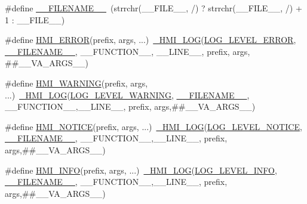 \begin{DoxyCompactItemize}
\item 
\#define \hyperlink{src_2hmi-debug_8h_a5fccb4fc71e44089a1b1a77fc76c0b68}{\+\_\+\+\_\+\+F\+I\+L\+E\+N\+A\+M\+E\+\_\+\+\_\+}~(strrchr(\+\_\+\+\_\+\+F\+I\+L\+E\+\_\+\+\_\+, \textquotesingle{}/\textquotesingle{}) ? strrchr(\+\_\+\+\_\+\+F\+I\+L\+E\+\_\+\+\_\+, \textquotesingle{}/\textquotesingle{}) + 1 \+: \+\_\+\+\_\+\+F\+I\+L\+E\+\_\+\+\_\+)
\item 
\#define \hyperlink{src_2hmi-debug_8h_a65bb6c7cfe38f8a724beab5059d36fb2}{H\+M\+I\+\_\+\+E\+R\+R\+OR}(prefix,  args, ...)~\hyperlink{src_2hmi-debug_8h_a0846b9d51e2e0612c4825a9a581aa40a}{\+\_\+\+H\+M\+I\+\_\+\+L\+OG}(\hyperlink{src_2hmi-debug_8h_aa5a9053636a30269210c54e734e0d583a5b40f003febbc3b535649d63f4b8a44f}{L\+O\+G\+\_\+\+L\+E\+V\+E\+L\+\_\+\+E\+R\+R\+OR}, \hyperlink{src_2hmi-debug_8h_a5fccb4fc71e44089a1b1a77fc76c0b68}{\+\_\+\+\_\+\+F\+I\+L\+E\+N\+A\+M\+E\+\_\+\+\_\+}, \+\_\+\+\_\+\+F\+U\+N\+C\+T\+I\+O\+N\+\_\+\+\_\+, \+\_\+\+\_\+\+L\+I\+N\+E\+\_\+\+\_\+, prefix, args, \#\#\+\_\+\+\_\+\+V\+A\+\_\+\+A\+R\+G\+S\+\_\+\+\_\+)
\item 
\#define \hyperlink{src_2hmi-debug_8h_a25361812432cd2480bc8f1a8e56ecbf7}{H\+M\+I\+\_\+\+W\+A\+R\+N\+I\+NG}(prefix,  args, ...)~\hyperlink{src_2hmi-debug_8h_a0846b9d51e2e0612c4825a9a581aa40a}{\+\_\+\+H\+M\+I\+\_\+\+L\+OG}(\hyperlink{src_2hmi-debug_8h_aa5a9053636a30269210c54e734e0d583a5b4dd81b4dc7eefbc55ba03415c627ef}{L\+O\+G\+\_\+\+L\+E\+V\+E\+L\+\_\+\+W\+A\+R\+N\+I\+NG}, \hyperlink{src_2hmi-debug_8h_a5fccb4fc71e44089a1b1a77fc76c0b68}{\+\_\+\+\_\+\+F\+I\+L\+E\+N\+A\+M\+E\+\_\+\+\_\+}, \+\_\+\+\_\+\+F\+U\+N\+C\+T\+I\+O\+N\+\_\+\+\_\+,\+\_\+\+\_\+\+L\+I\+N\+E\+\_\+\+\_\+, prefix, args,\#\#\+\_\+\+\_\+\+V\+A\+\_\+\+A\+R\+G\+S\+\_\+\+\_\+)
\item 
\#define \hyperlink{src_2hmi-debug_8h_abc0d6e0760017d8ae48b836925b2ef15}{H\+M\+I\+\_\+\+N\+O\+T\+I\+CE}(prefix,  args, ...)~\hyperlink{src_2hmi-debug_8h_a0846b9d51e2e0612c4825a9a581aa40a}{\+\_\+\+H\+M\+I\+\_\+\+L\+OG}(\hyperlink{src_2hmi-debug_8h_aa5a9053636a30269210c54e734e0d583a23ae4d711a7bbb3900240cb7316b4b4e}{L\+O\+G\+\_\+\+L\+E\+V\+E\+L\+\_\+\+N\+O\+T\+I\+CE}, \hyperlink{src_2hmi-debug_8h_a5fccb4fc71e44089a1b1a77fc76c0b68}{\+\_\+\+\_\+\+F\+I\+L\+E\+N\+A\+M\+E\+\_\+\+\_\+}, \+\_\+\+\_\+\+F\+U\+N\+C\+T\+I\+O\+N\+\_\+\+\_\+,\+\_\+\+\_\+\+L\+I\+N\+E\+\_\+\+\_\+, prefix, args,\#\#\+\_\+\+\_\+\+V\+A\+\_\+\+A\+R\+G\+S\+\_\+\+\_\+)
\item 
\#define \hyperlink{src_2hmi-debug_8h_a11b249a67108f0f4c50a0fc8a3eb4f5c}{H\+M\+I\+\_\+\+I\+N\+FO}(prefix,  args, ...)~\hyperlink{src_2hmi-debug_8h_a0846b9d51e2e0612c4825a9a581aa40a}{\+\_\+\+H\+M\+I\+\_\+\+L\+OG}(\hyperlink{src_2hmi-debug_8h_aa5a9053636a30269210c54e734e0d583aedee1e3159bfe7d918b6e29873c5aee4}{L\+O\+G\+\_\+\+L\+E\+V\+E\+L\+\_\+\+I\+N\+FO}, \hyperlink{src_2hmi-debug_8h_a5fccb4fc71e44089a1b1a77fc76c0b68}{\+\_\+\+\_\+\+F\+I\+L\+E\+N\+A\+M\+E\+\_\+\+\_\+}, \+\_\+\+\_\+\+F\+U\+N\+C\+T\+I\+O\+N\+\_\+\+\_\+,\+\_\+\+\_\+\+L\+I\+N\+E\+\_\+\+\_\+, prefix, args,\#\#\+\_\+\+\_\+\+V\+A\+\_\+\+A\+R\+G\+S\+\_\+\+\_\+)

\end{DoxyCompactItemize}
